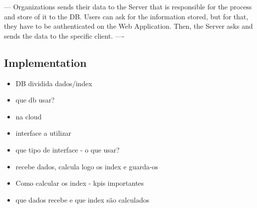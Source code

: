 ---
Organizations sends their data to the Server that is responsible for the process and store of it to the DB. Users can ask for the information stored, but for that, they have to be authenticated on the Web Application. Then, the Server asks and sends the data to the specific client.
----

\subsection{Implementation}

\begin{itemize}
	\item DB dividida dados/index
	\item que db usar?
	\item na cloud
	\item interface a utilizar
	\item que tipo de interface - o que usar?
	\item recebe dados, calcula logo os index e guarda-os
	\item Como calcular os index - kpis importantes
	\item que dados recebe e que index são calculados
\end{itemize}
\fi